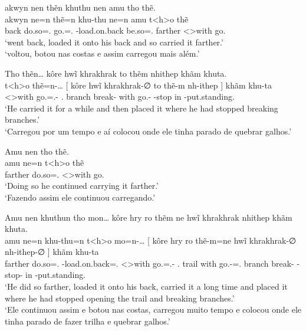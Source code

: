 \documentclass[output=paper,
modfonts,nonflat
]{langsci/langscibook}
\begin{document}
\ea  akwyn nen thẽn khuthu nen amu tho thẽ. \\[.3em]
\gll akwyn ne=n             thẽ=n             khu-thu             ne=n             amu     t<h>o        thẽ      \\
     back  do.so=\AAnd.\Ss{} go.\Sg=\AAnd.\Ss{} \Third-load.on.back be.so=\AAnd.\Ss{} farther <\Third>with go.\Sg{} \\
\glt `went back, loaded it onto his back and so carried it farther.' \\
     `voltou, botou nas costas e assim carregou mais além.' \\
\z

\ea  Tho thẽn\ldots{} kôre hwĩ khrakhrak to thẽm nhithep khãm khuta. \\[.3em]
\gll t<h>o        thẽ=n-\ldots{}             [  kôre          hwĩ    khrakhrak-∅   to   thẽ-m          nh-ithep ]  khãm khu-ta                    \\
     <\Third>with go.\Sg=\AAnd.\Ss{}-\Ints{} {} \Third.\Erg{} branch break-\Nmlz{} with go.\Sg-\Nmlz{} \E-stop  {} in   \Third-put.standing.\Sg{} \\
\glt `He carried it for a while and then placed it where he had stopped breaking branches.' \\
     `Carregou por um tempo e aí colocou onde ele tinha parado de quebrar galhos.' \\
\z

\ea  Amu nen tho thẽ. \\[.3em]
\gll amu     ne=n             t<h>o        thẽ      \\
     farther do.so=\AAnd.\Ss{} <\Third>with go.\Sg{} \\
\glt `Doing so he continued carrying it farther.' \\
     `Fazendo assim ele continuou carregando.' \\
\z

\ea  Amu nen khuthun tho mon\ldots{} kôre hry ro thẽm ne hwĩ khrakhrak nhithep khãm khuta. \\[.3em]
\gll amu     ne=n             khu-thu=n                      t<h>o        mo=n-\ldots{}              [  kôre          hry   ro   thẽ-m=ne                  hwĩ    khrakhrak-∅   nh-ithep-∅      ]  khãm khu-ta                    \\
     farther do.so=\AAnd.\Ss{} \Third-load.on.back=\AAnd.\Ss{} <\Third>with go.\Pl=\AAnd.\Ss{}-\Ints{} {} \Third.\Erg{} trail with go.\Sg-\Nmlz{}=\AAnd.\Ss{} branch break-\Nmlz{} \E-stop-\Nmlz{} {} in   \Third-put.standing.\Sg{} \\
\glt `He did so farther, loaded it onto his back, carried it a long time and placed it where he had stopped opening the trail and breaking branches.' \\
     `Ele continuou assim e botou nas costas, carregou muito tempo e colocou onde ele tinha parado de fazer trilha e quebrar galhos.' \\
\z
\end{document}
